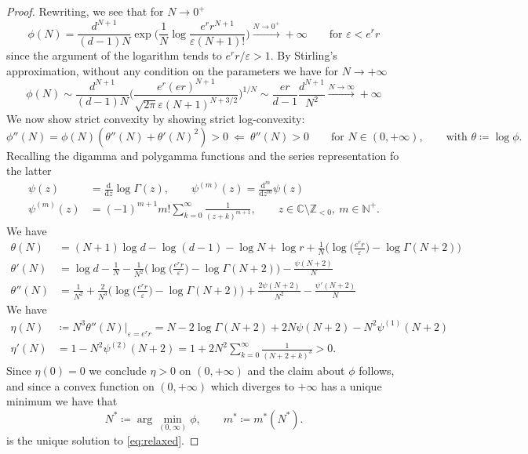 \documentclass{article}
\def\d{\mathrm{d}}
\def\eps{\varepsilon}
\numberwithin{equation}{section}
\theoremstyle{definition}
\theoremstyle{remark}
\begin{document}
\begin{proof}
Rewriting, we see that for $N \to 0^+$
\[
\phi(N) =  \frac{d^{N+1}}{(d-1)N} \exp\bigg(\frac 1N \log \frac{e^r r^{N+1}}{\eps (N+1)!} \bigg) \xrightarrow{N \to 0^+} +\infty \qquad \text{for } \eps < e^r r
\]
since the argument of the logarithm tends to $e^r r/\eps > 1$. By Stirling's approximation, without any condition on the parameters we have for $N \to +\infty$
\[
\phi(N) \sim \frac{d^{N+1}}{(d-1)N} \bigg(\frac{e^r (er)^{N+1}}{\sqrt{2\pi}\eps (N+1)^{N+3/2}} \bigg)^{1/N} \sim \frac{er}{d-1} \frac{d^{N+1}}{N^2} \xrightarrow{N \to \infty} + \infty
\]
We now show strict convexity by showing strict log-convexity:
\[
\phi''(N) = \phi(N)(\theta''(N) + \theta'(N)^2) > 0 \ \Longleftarrow \ \theta''(N) > 0 \qquad \text{for } N \in (0,+\infty), \qquad \text{with } \theta \coloneqq \log \phi.
\]
Recalling the digamma and polygamma functions and the series representation fo the latter \cite[(6.4.10)]{handbook}
\begin{align*}
	\psi(z) &= \frac{\d}{\d z} \log \Gamma(z),\qquad \psi^{(m)}(z) = \frac{\d^m}{\d z^m} \psi(z) \\
	\psi^{(m)}(z) &= (-1)^{m+1}m! \sum_{k = 0}^\infty \frac{1}{(z+k)^{m+1}}, \qquad z \in \mathbb C \setminus \mathbb Z_{<0}, \ m \in \mathbb N^+.
\end{align*}
We have
\begin{equation}\label{eq:theta}
\begin{split}
	\theta(N) &= (N+1)\log d - \log(d-1) - \log N + \log r + \frac 1N \Big( \log \Big(\frac{e^r r}{\eps}\Big) - \log \Gamma(N+2) \Big) \\
	\theta'(N) &= \log d -\frac 1N -\frac{1}{N^2} \Big( \log \Big(\frac{e^r r}{\eps}\Big) - \log \Gamma(N+2) \Big) -\frac{\psi(N+2)}{N} \\
	\theta''(N) &= \frac{1}{N^2} +\frac{2}{N^3} \Big( \log \Big(\frac{e^r r}{\eps}\Big) - \log \Gamma(N+2) \Big) +\frac{2\psi(N+2)}{N^{2}} -\frac{\psi'(N+2)}{N}
\end{split}
\end{equation}
We have
\begin{align*}
	\eta(N) &\coloneqq N^3 \theta''(N)\big|_{\eps = e^r r} = N - 2\log \Gamma(N+2) + 2N\psi(N+2) - N^2\psi^{(1)}(N+2) \\
	\eta'(N) &= 1 - N^2\psi^{(2)}(N+2) = 1 + 2N^2 \sum_{k = 0}^\infty \frac{1}{(N+2+k)^3} > 0.
\end{align*}
Since $\eta(0) = 0$ we conclude $\eta > 0$ on $(0,+\infty)$ and the claim about $\phi$ follows, and since a convex function on $(0,+\infty)$ which diverges to $+\infty$ has a unique minimum we have that
\begin{equation}
	N^* \coloneqq \arg\min_{(0,\infty)} \phi, \qquad m^* \coloneqq m^*(N^*).
\end{equation}
is the unique solution to \eqref{eq:relaxed}.
\end{proof}
\end{document}
